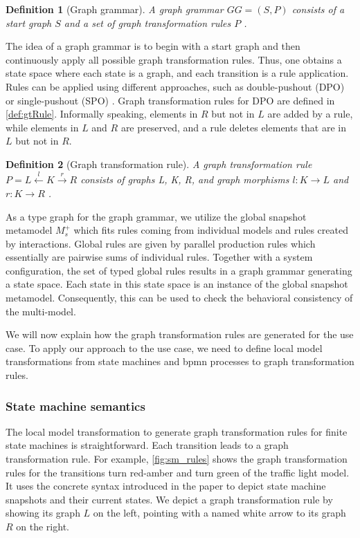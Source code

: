 \documentclass{jot}
\newtheorem{definition}{Definition}
\begin{document}
\begin{definition}[Graph grammar] \label{def:graphGrammar}
A graph grammar $GG=(S, P)$ consists of a start graph $S$ and a set of graph transformation rules $P$ \cite{ehrigFundamentalsAlgebraicGraph2006}. 
\end{definition}

The idea of a graph grammar is to begin with a start graph and then continuously apply all possible graph transformation rules.
Thus, one obtains a state space where each state is a graph, and each transition is a rule application.
Rules can be applied using different approaches, such as double-pushout (DPO) \cite{ehrigFundamentalsAlgebraicGraph2006} or single-pushout (SPO) \cite{loweAlgebraicApproachSinglepushout1993}.
Graph transformation rules for DPO are defined in \autoref{def:gtRule}.
Informally speaking, elements in $R$ but not in $L$ are added by a rule, while elements in $L$ and $R$ are preserved, and a rule deletes elements that are in $L$ but not in $R$.

\begin{definition}[Graph transformation rule] \label{def:gtRule}
A graph transformation rule $P= L \overset{l}{\leftarrow} K \overset{r}{\to} R$ consists of graphs L, K, R, and graph morphisms $l: K \to L$ and $r: K \to R$ \cite{ehrigFundamentalsAlgebraicGraph2006}. 
\end{definition}

As a type graph for the graph grammar, we utilize the global snapshot metamodel $M_s^+$ which fits rules coming from individual models and rules created by interactions.
Global rules are given by parallel production rules \cite[Definition 3.2.7]{baldanConcurrentSemanticsAlgebraic1999} which essentially are pairwise sums of individual rules.
Together with a system configuration, the set of typed global rules results in a graph grammar generating a state space.
Each state in this state space is an instance of the global snapshot metamodel.
Consequently, this can be used to check the behavioral consistency of the multi-model.

We will now explain how the graph transformation rules are generated for the use case.
To apply our approach to the use case, we need to define local model transformations from state machines and \gls*{bpmn} processes to graph transformation rules.


\subsubsection{State machine semantics}
The local model transformation to generate graph transformation rules for finite state machines is straightforward.
Each transition leads to a graph transformation rule.
For example, \autoref{fig:sm_rules} shows the graph transformation rules for the transitions \textsf{turn red-amber} and \textsf{turn green} of the traffic light model.
It uses the concrete syntax introduced in the paper to depict state machine snapshots and their current states.
We depict a graph transformation rule by showing its graph $L$ on the left, pointing with a named white arrow to its graph $R$ on the right.
\end{document}
